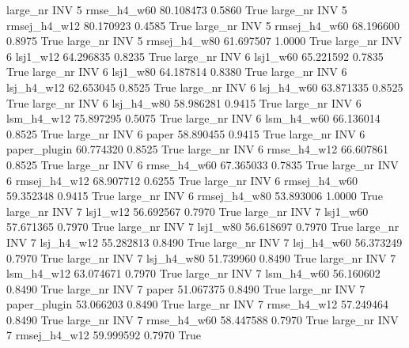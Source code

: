  large_nr      INV                 5  rmse_h4_w60   80.108473      0.5860    True
  large_nr      INV                 5 rmsej_h4_w12   80.170923      0.4585    True
  large_nr      INV                 5 rmsej_h4_w60   68.196600      0.8975    True
  large_nr      INV                 5 rmsej_h4_w80   61.697507      1.0000    True
  large_nr      INV                 6     lsj1_w12   64.296835      0.8235    True
  large_nr      INV                 6     lsj1_w60   65.221592      0.7835    True
  large_nr      INV                 6     lsj1_w80   64.187814      0.8380    True
  large_nr      INV                 6   lsj_h4_w12   62.653045      0.8525    True
  large_nr      INV                 6   lsj_h4_w60   63.871335      0.8525    True
  large_nr      INV                 6   lsj_h4_w80   58.986281      0.9415    True
  large_nr      INV                 6   lsm_h4_w12   75.897295      0.5075    True
  large_nr      INV                 6   lsm_h4_w60   66.136014      0.8525    True
  large_nr      INV                 6        paper   58.890455      0.9415    True
  large_nr      INV                 6 paper_plugin   60.774320      0.8525    True
  large_nr      INV                 6  rmse_h4_w12   66.607861      0.8525    True
  large_nr      INV                 6  rmse_h4_w60   67.365033      0.7835    True
  large_nr      INV                 6 rmsej_h4_w12   68.907712      0.6255    True
  large_nr      INV                 6 rmsej_h4_w60   59.352348      0.9415    True
  large_nr      INV                 6 rmsej_h4_w80   53.893006      1.0000    True
  large_nr      INV                 7     lsj1_w12   56.692567      0.7970    True
  large_nr      INV                 7     lsj1_w60   57.671365      0.7970    True
  large_nr      INV                 7     lsj1_w80   56.618697      0.7970    True
  large_nr      INV                 7   lsj_h4_w12   55.282813      0.8490    True
  large_nr      INV                 7   lsj_h4_w60   56.373249      0.7970    True
  large_nr      INV                 7   lsj_h4_w80   51.739960      0.8490    True
  large_nr      INV                 7   lsm_h4_w12   63.074671      0.7970    True
  large_nr      INV                 7   lsm_h4_w60   56.160602      0.8490    True
  large_nr      INV                 7        paper   51.067375      0.8490    True
  large_nr      INV                 7 paper_plugin   53.066203      0.8490    True
  large_nr      INV                 7  rmse_h4_w12   57.249464      0.8490    True
  large_nr      INV                 7  rmse_h4_w60   58.447588      0.7970    True
  large_nr      INV                 7 rmsej_h4_w12   59.999592      0.7970    True
